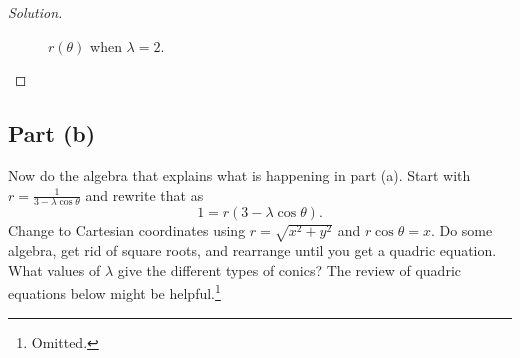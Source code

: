 \documentclass[letterpaper, 12pt]{amsart}
\theoremstyle{definition}  							%
\begin{document}
\begin{proof}[Solution]
\begin{figure}[b]
\begin{minipage}[b]{.4\textwidth}
				\caption{$r(\theta)$ when $\lambda = 2$.}
				\label{lambda_2}
			\end{minipage}
		\end{figure}
		\end{proof}

		\subsection*{Part (b)}
		Now do the algebra that explains what is happening in part (a). 
		Start with $r = \tfrac{1}{3-\lambda\cos\theta}$ and rewrite that as $$1 = r(3-\lambda\cos\theta).$$
		Change to Cartesian coordinates using $r = \sqrt{x^2 + y^2}$ and $r \cos\theta = x$. 
		Do some algebra, get rid of square roots, and rearrange until you get a quadric equation. 
		What values of $\lambda$ give the different types of conics? 
		The review of quadric equations below might be helpful.\footnote{Omitted.}
\end{document}
